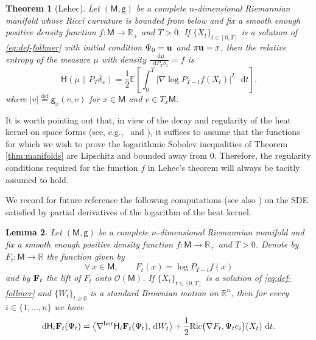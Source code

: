 \documentclass[a4paper,twoside,11pt,reqno]{amsart}
\newcommand{\eqdef}{\stackrel{\mathrm{def}}{=}}
\newtheorem{theorem}{Theorem}
\newtheorem{lemma}[theorem]{Lemma}
\newcommand*\diff{\mathop{}\!\mathrm{d}}
\newcommand{\R}{\mathbb{R}} %
\newcommand{\li}{\bf }
\newcommand{\MM}{\mathsf{M}}
\newcommand{\GG}{\mathsf{g}}
\newcommand{\mb}{\mathbb}
\newcommand{\ms}{\mathscr}
\newcommand{\mr}{\mathrm}
\newcommand{\HH}{\mathsf{H}}
\begin{document}
\begin{theorem} [Lehec]
\label{thm:Lehec}
Let $(\MM, \GG)$ be a complete $n$-dimensional Riemannian manifold whose Ricci curvature is bounded from below and fix a smooth enough positive density function $f:\MM\to\R_+$ and $T>0$. If $\{X_t\}_{t\in[0,T]}$ is a solution of \eqref{eq:def-follmer} with initial condition $\Psi_0 = {\bf u}$ and $\pi{\bf u}=x$, then the relative entropy of the measure $\mu$ with density $\frac{\diff\mu}{\diff P_T\delta_x} = f$ is
\begin{equation} \label{eq:lehec-formula}
\HH(\mu \| P_T\delta_x) = \frac{1}{2}\mb{E} \left[ \int_0^T \big| \nabla \log P_{T-t}f(X_t)\big|^2\,\diff t \right].
\end{equation}
where $|v|\eqdef \GG_x(v,v)$ for $x\in \MM$ and $v\in T_x\MM$.
\end{theorem}

It is worth pointing out that, in view of the decay and regularity of the heat kernel on space forms (see, e.g.,~\cite[Chapter~6]{Cha84} and \cite{McK70,DGM76,GN98}),  it suffices to assume that the functions for which we wish to prove the logarithmic Sobolev inequalities of Theorem \ref{thm:manifolds}  are Lipschitz and bounded away from 0.  Therefore,  the regularity conditions required for the function $f$ in Lehec's theorem will always be tacitly assumed to hold.

We record for future reference the following  computations (see also \cite[Equations (5.5.2) -- (5.5.4)]{Hsu02}) on the SDE satisfied by partial derivatives of the logarithm of the heat kernel.

\begin{lemma} \label{lem:sde-for-Hi}
Let  $(\MM, \GG)$ be a complete $n$-dimensional Riemannian manifold and fix a smooth enough positive density function $f:\MM\to\R_+$ and $T>0$. Denote by ${F}_t:\MM\to\R$ the function given by
\begin{equation}
\forall \ x\in\MM,\qquad { F}_t(x) = \log P_{T-t} f(x)
\end{equation} 
and by ${\li F}_t$ the lift of $F_t$ onto $\ms{O}(\MM)$. If $\{X_t\}_{t\in[0,T]}$ is a solution of \eqref{eq:def-follmer} and $\{W_t\}_{t\geq0}$ is a standard Brownian motion on $\R^n$, then for every $i\in\{1,\ldots,n\}$ we have
\begin{equation}
\diff \HH_i{\li F}_t (\Psi_t) = \big\langle \nabla^{\mr{hor}} \HH_i {\li F}_t(\Psi_t), \,\diff W_t \big\rangle + \frac{1}{2} \mr{Ric}\big(\nabla F_t , \Psi_t e_i\big) (X_t)\,\diff t.
\end{equation}
\end{lemma}
\end{document}
